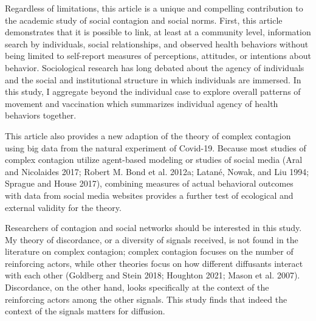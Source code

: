 Regardless of limitations, this article is a unique and compelling contribution
to the academic study of social contagion and social norms. First, this article
demonstrates that it is possible to link, at least at a community level,
information search by individuals, social relationships, and observed health
behaviors without being limited to self-report measures of perceptions,
attitudes, or intentions about behavior. Sociological research has long debated
about the agency of individuals and the social and institutional structure in
which individuals are immersed. In this study, I aggregate beyond the individual
case to explore overall patterns of movement and vaccination which summarizes
individual agency of health behaviors together.

This article also provides a new adaption of the theory of complex contagion
using big data from the natural experiment of Covid-19. Because most studies of
complex contagion utilize agent-based modeling or studies of social media
(Aral and Nicolaides 2017; Robert M. Bond et al. 2012a; Latané, Nowak, and Liu 1994; Sprague and House 2017), combining measures of actual behavioral outcomes with data from
social media websites provides a further test of ecological and external
validity for the theory.

Researchers of contagion and social networks should be interested in this study.
My theory of discordance, or a diversity of signals received, is not found in
the literature on complex contagion; complex contagion focuses on the number of
reinforcing actors, while other theories focus on how different diffusants
interact with each other (Goldberg and Stein 2018; Houghton 2021; Mason et al. 2007). Discordance, on the other hand, looks specifically at the
context of the reinforcing actors among the other signals. This study finds that
indeed the context of the signals matters for diffusion.